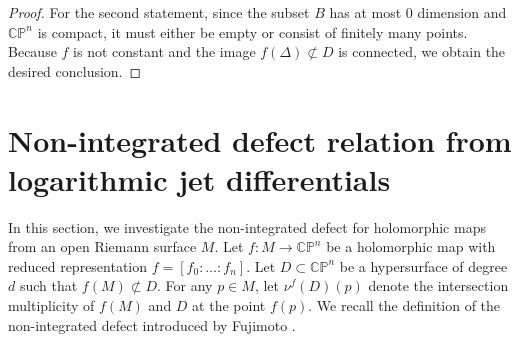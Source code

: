 \documentclass[english, 12pt]{amsart}
\def\log{\mathrm{log}\,}
\theoremstyle{plain}
\newtheorem{defi}[thm]{Definition}
\theoremstyle{remark}
\numberwithin{equation}{section}
\theoremstyle{plain}
\theoremstyle{named}
\begin{document}
\begin{proof}
	For the second statement, since the subset $B$ has at most 0 dimension and $\mathbb{C}\mathbb{P}^n$ is compact, it must either be empty or consist of finitely many points. Because $f$ is not constant and the image $f(\Delta)\not\subset D$ is connected, we obtain the desired conclusion. 
\end{proof}

\section{Non-integrated defect relation from logarithmic jet differentials}
In this section, we investigate the non-integrated defect for holomorphic maps from an open Riemann surface $M$. Let $f\colon M\rightarrow\mathbb{CP}^n$ be a holomorphic map with reduced representation $f=[f_0:\dots:f_n]$. Let $D\subset \mathbb{CP}^n$ be a hypersurface of degree $d$ such that $f(M)\not\subset D$. For any $p\in M$, let $\nu^f(D)(p)$ denote the intersection multiplicity of $f(M)$ and $D$ at the point $f(p)$. We recall the definition of the non-integrated defect introduced by Fujimoto \cite{Fujimoto83_1}.
\end{document}
